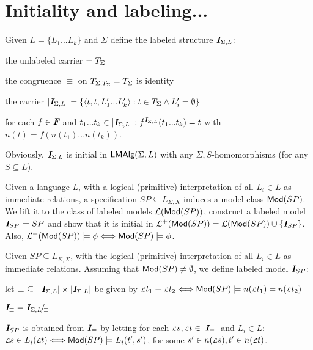 \documentclass[12pt]{article}
\begin{document}
\section{Initiality and labeling...}
\begin{Definition}
Given $L=\{L_1...L_k\}$ and $\Sigma$ define the labeled structure $\mbox{\bf{\em I}}_{\Sigma,L}$:
\begin{enum}
\item the unlabeled carrier $= T_{\Sigma}$
\item the congruence $\equiv$ on $T_{\Sigma,\scriptsize{T_{\Sigma}}}=T_{\Sigma}$ is identity
\item the carrier
$|\mbox{\bf{\em I}}_{\Sigma,L}|=\{\langle t,t,L'_1...L'_k\rangle:t\in T_{\Sigma}\land
L'_i=\emptyset\}$
\item for each $f\in\mbox{\bf{\em F}}$ and $t_1...t_k\in|\mbox{\bf{\em I}}_{\Sigma,L}|:
f^{\scriptsize\mbox{\bf{\em I}}_{\Sigma,L}}(t_1...t_k) = t$ with $n(t)=f(n(t_1)...n(t_k))$.
\end{enum}
\end{Definition}
Obviously, $\mbox{\bf{\em I}}_{\Sigma,L}$ is initial in ${\sf LMAlg}(\Sigma,L)$ with any
$\Sigma,S$-homomorphisms (for any $S\subseteq L$).

Given a language $L$, with a logical (primitive) interpretation of all
$L_i\in L$ as immediate relations,
a specification $SP\subseteq L_{\Sigma,X}$ induces a model class ${\sf {Mod}}(SP)$. We
lift it to the class of labeled models ${\cal L}({\sf {Mod}}(SP))$, 
construct a labeled model $\mbox{\bf{\em I}}_{SP}\models SP$ and show that it is initial
in ${\cal L}^+({\sf {Mod}}(SP)) = {\cal L}({\sf {Mod}}(SP))\cup\{\mbox{\bf{\em I}}_{SP}\}$. Also,
${\cal L}^+({\sf {Mod}}(SP))\models\phi\Longleftrightarrow {\sf {Mod}}(SP)\models \phi$.

\begin{Definition}
Given $SP\subseteq L_{\Sigma,X}$, with the logical (primitive) interpretation
of all $L_i\in L$ as immediate relations. Assuming that ${\sf {Mod}}(SP)\not=\emptyset$, we define labeled model
$\mbox{\bf{\em I}}_{SP}$: %
\begin{enum}
\item let $\equiv\ \subseteq\ \car{\init_{\Sigma,L}}\times
\car{\init_{\Sigma,L}}$ be given by ${\scriptstyle{\cal L}}{t}_1\equiv {\scriptstyle{\cal L}}{t}_2\Longleftrightarrow {\sf {Mod}}(SP)\models
n({\scriptstyle{\cal L}}{t}_1)=n({\scriptstyle{\cal L}}{t}_2)$
\item $\mbox{\bf{\em I}}_{\equiv}=\mbox{\bf{\em I}}_{\Sigma,L}\!{\textstyle /}\!_{\equiv}$
\item $\mbox{\bf{\em I}}_{SP}$ is obtained from $\mbox{\bf{\em I}}_{\equiv}$ by letting for each ${\scriptstyle{\cal L}}{s}, {\scriptstyle{\cal L}}{t}
\in|\mbox{\bf{\em I}}_{\equiv}|$ and $L_i\in L:$ \\
${\scriptstyle{\cal L}}{s}\in L_i({\scriptstyle{\cal L}}{t})\Longleftrightarrow {\sf {Mod}}(SP)\models
L_i(t',s')$, for some $s'\in n({\scriptstyle{\cal L}}{s}), t'\in n({\scriptstyle{\cal L}}{t})$.
\end{enum}
\end{Definition}
\end{document}
